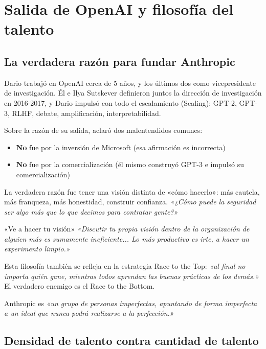 \section{Salida de OpenAI y filosofía del talento}

\subsection{La verdadera razón para fundar Anthropic}

Dario trabajó en OpenAI cerca de 5 años, y los últimos dos como vicepresidente de investigación. Él e Ilya Sutskever definieron juntos la dirección de investigación en 2016-2017, y Dario impulsó con todo el escalamiento (Scaling): GPT-2, GPT-3, RLHF, debate, amplificación, interpretabilidad.

Sobre la razón de su salida, aclaró dos malentendidos comunes:
\begin{itemize}
    \item \textbf{No} fue por la inversión de Microsoft (esa afirmación es incorrecta)
    \item \textbf{No} fue por la comercialización (él mismo construyó GPT-3 e impulsó su comercialización)
\end{itemize}

La verdadera razón fue tener una visión distinta de «cómo hacerlo»: más cautela, más franqueza, más honestidad, construir confianza. \textit{«¿Cómo puede la seguridad ser algo más que lo que decimos para contratar gente?»}

\begin{importantbox}{«Ve a hacer tu visión»}
\textit{«Discutir tu propia visión dentro de la organización de alguien más es sumamente ineficiente... Lo más productivo es irte, a hacer un experimento limpio.»}

Esta filosofía también se refleja en la estrategia Race to the Top: \textit{«al final no importa quién gane, mientras todos aprendan las buenas prácticas de los demás.»} El verdadero enemigo es el Race to the Bottom.

Anthropic es \textit{«un grupo de personas imperfectas, apuntando de forma imperfecta a un ideal que nunca podrá realizarse a la perfección.»}
\end{importantbox}

\subsection{Densidad de talento contra cantidad de talento}


